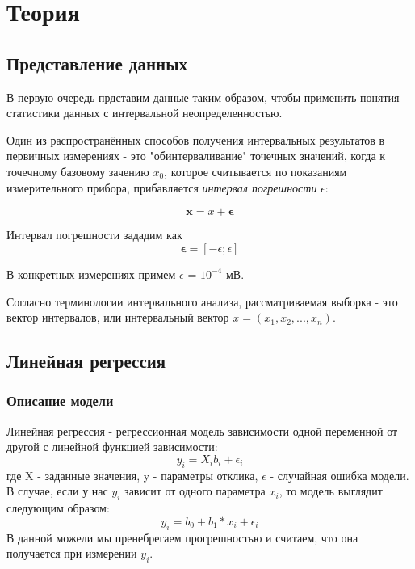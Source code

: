 \documentclass[a4paper,14pt]{article}
\begin{document}
	\section{Теория}
	\subsection{Представление данных}
	
	В первую очередь прдставим данные таким образом, чтобы применить понятия статистики данных с интервальной неопределенностью.
	
	Один из распространённых способов получения интервальных результатов в первичных измерениях - это "обинтерваливание" точечных значений, когда к точечному базовому зачению $x_0$, которое считывается по показаниям измерительного прибора, прибавляется
	\textit{интервал погрешности} $\epsilon$:
	
	\begin{equation}
		\textbf{x}=\overset{.}{x}+ \mathbf{\epsilon}
	\end{equation}
	
	Интервал погрешности зададим как
	\begin{equation*}
		\mathbf{\epsilon}=[-\epsilon;\epsilon]
	\end{equation*}
	
	В конкретных измерениях примем $\epsilon$ = $10^{-4}$ мВ.
	
	Согласно терминологии интервального анализа, рассматриваемая выборка - это вектор интервалов, или интервальный вектор $x=(x_1, x_2, ..., x_n)$.
	
	\subsection{Линейная регрессия}
	\subsubsection{Описание модели}
	Линейная регрессия - регрессионная модель зависимости одной переменной от другой с линейной функцией зависимости:
	\begin{equation*}
		y_i = X_ib_i + \epsilon_i
	\end{equation*}
	где X - заданные значения, y - параметры отклика, $\epsilon$ - случайная ошибка модели.
	В случае, если у нас $y_i$ зависит от одного параметра $x_i$, то модель выглядит следующим образом:
	\begin{equation}
		y_i = b_0 + b_1*x_i + \epsilon_i
	\end{equation}
	В данной можели мы пренебрегаем прогрешностью и считаем, что она получается при измерении $y_i$.
	
\end{document}
